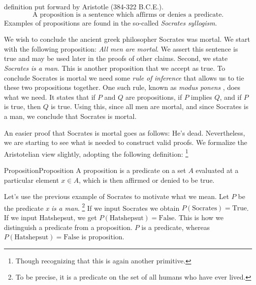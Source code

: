         definition put forward by Aristotle (384-322 B.C.E.).
        \begin{equation}
            \text{A proposition is a sentence which affirms or denies a }
            \text{predicate.}
        \end{equation}
        Examples of propositions are found in the so-called
        \textit{Socrates syllogism}.
        \begin{example}
            We wish to conclude the ancient greek philosopher
            Socrates was mortal. We start with the following
            proposition: \textit{All men are mortal}. We assert this sentence is
            true and may be used later in the proofs of other claims. Second,
            we state \textit{Socrates is a man}. This is another proposition
            that we accept as true. To conclude Socrates is mortal we need some
            \textit{rule of inference} that allows us to tie these two
            propositions together. One such rule, known as
            \textit{modus ponens}%
            , does what we need. It states
            that if $P$ and $Q$ are propositions, if $P$ implies $Q$, and if $P$
            is true, then $Q$ is true. Using this, since all men are mortal, and
            since Socrates is a man, we conclude that Socrates is mortal.
        \end{example}
        An easier proof that Socrates is mortal goes as follows: He's dead.
        Nevertheless, we are starting to see what is needed to construct valid
        proofs. We formalize the Aristotelian view slightly, adopting the
        following definition:%
        \footnote{%
            Though recognizing that this is again another primitive.
        }
        \begin{fdefinition}{Proposition}{Proposition}
            A \gls{proposition} is a \gls{predicate} on a \gls{set} $A$
            evaluated at a particular element $x\in{A}$, which is then affirmed
            or denied to be true.%
        \end{fdefinition}
        \begin{example}
            Let's use the previous example of Socrates to motivate what we mean.
            Let $P$ be the predicate \textit{x is a man}.%
            \footnote{%
                To be precise, it is a predicate on the set of all humans who
                have ever lived.
            }
            If we input Socrates we obtain $P(\text{Socrates})=\text{True}$. If
            we input Hatshepsut, we get $P(\text{Hatshepsut})=\text{False}$.
            This is how we distinguish a predicate from a proposition. $P$ is
            a predicate, whereas $P(\text{Hatshepsut})=\text{False}$ is
            proposition.
        \end{example}
